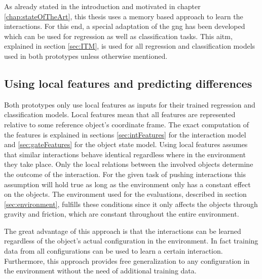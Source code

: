 As already stated in the introduction and motivated in chapter \ref{chap:stateOfTheArt}, this thesis uses a memory based approach to learn the interactions. For this end, a special adaptation of the \gls{gng} has been developed which can be used for regression as well as classification tasks. This \gls{aitm}, explained in section \ref{sec:ITM}, is used for all regression and classification models used in both prototypes unless otherwise mentioned. 

\subsection{Using local features and predicting differences}
Both prototypes only use local features as inputs for their trained regression and classification models. 
Local features mean that all features are represented relative to some reference object's coordinate frame. The exact computation of the features is explained in sections \ref{sec:intFeatures} for the interaction model and \ref{sec:gateFeatures} for the object state model.
Using local features assumes that similar interactions behave identical regardless where in the environment they take place. 
Only the local relations between the involved objects determine the outcome of the interaction. 
For the given task of pushing interactions this assumption will hold true as long as the environment only has a constant effect on the objects. The environment used for the evaluations, described in section \ref{sec:environment}, fulfills these conditions since it only affects the objects through gravity and friction, which are constant throughout the entire environment. 

The great advantage of this approach is that the interactions can be learned regardless of the object's actual configuration in the environment. In fact training data from all configurations can be used to learn a certain interaction. Furthermore, this approach provides free generalization to any configuration in the environment without the need of additional training data.

